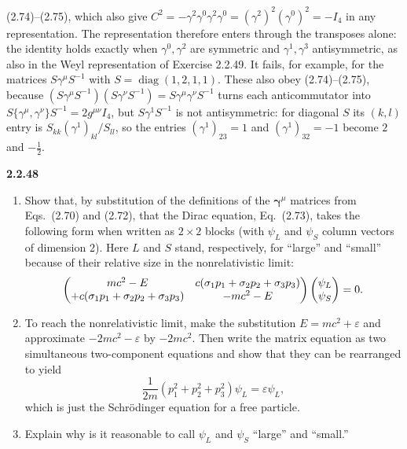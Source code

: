 (2.74)--(2.75), which also give
$C^2=-\gamma^2\gamma^0\gamma^2\gamma^0=(\gamma^2)^2(\gamma^0)^2=-I_4$
in any representation. The representation therefore enters through
the transposes alone: the identity holds exactly when
$\gamma^0,\gamma^2$ are symmetric and $\gamma^1,\gamma^3$
antisymmetric, as also in the Weyl representation of
Exercise 2.2.49. It fails, for example, for the matrices
$S\gamma^\mu S^{-1}$ with $S=\operatorname{diag}(1,2,1,1)$. These
also obey (2.74)--(2.75), because
$(S\gamma^\mu S^{-1})(S\gamma^\nu S^{-1})=S\gamma^\mu\gamma^\nu S^{-1}$
turns each anticommutator into
$S\{\gamma^\mu,\gamma^\nu\}S^{-1}=2g^{\mu\nu}I_4$, but
$S\gamma^1S^{-1}$ is not antisymmetric: for diagonal $S$ its $(k,l)$
entry is $S_{kk}(\gamma^1)_{kl}/S_{ll}$, so the entries
$(\gamma^1)_{23}=1$ and $(\gamma^1)_{32}=-1$ become $2$ and
$-\tfrac12$.

\par\bigskip
\noindent\textbf{2.2.48}\quad
\begin{enumerate}
\item[(a)] Show that, by substitution of the definitions of the
  $\boldsymbol{\gamma}^{\mu}$ matrices from Eqs.~(2.70) and (2.72), that the
  Dirac equation, Eq.~(2.73), takes the following form when written as
  $2\times2$ blocks (with $\psi_{L}$ and $\psi_{S}$ column vectors of
  dimension 2). Here $L$ and $S$ stand, respectively, for ``large'' and
  ``small'' because of their relative size in the nonrelativistic limit:
  \[
  \begin{pmatrix}
  mc^{2}-E&c(\sigma_{1}p_{1}+\sigma_{2}p_{2}+\sigma_{3}p_{3})\\
  \erratum{+}c(\sigma_{1}p_{1}+\sigma_{2}p_{2}+\sigma_{3}p_{3})&-mc^{2}-E
  \end{pmatrix}
  \begin{pmatrix}\psi_{L}\\\psi_{S}\end{pmatrix}=0.
  \]
\item[(b)] 
  To reach the nonrelativistic limit, make the substitution
  $E=mc^{2}+\varepsilon$ and approximate $-2mc^{2}-\varepsilon$ by $-2mc^{2}$.
  Then write the matrix equation as two simultaneous two-component equations
  and show that they can be rearranged to yield
  \[
  \frac{1}{2m}\left(p_{1}^{2}+p_{2}^{2}+p_{3}^{2}\right)\psi_{L}
  =\varepsilon\psi_{L},
  \]
  which is just the Schr\"odinger equation for a free particle.
\item[(c)] Explain why is it reasonable to call $\psi_{L}$ and $\psi_{S}$
  ``large'' and ``small.''
\end{enumerate}
\solution
{}

